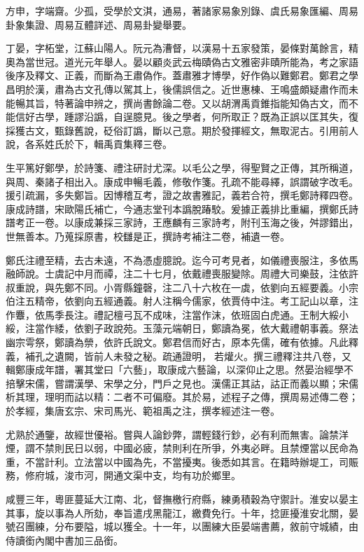 \begin{pinyinscope}
方申，字端齋。少孤，受學於文淇，通易，著諸家易象別錄、虞氏易象匯編、周易卦象集證、周易互體詳述、周易卦變舉要。

丁晏，字柘堂，江蘇山陽人。阮元為漕督，以漢易十五家發策，晏條對萬餘言，精奧為當世冠。道光元年舉人。晏以顧炎武云梅賾偽古文雅密非賾所能為，考之家語後序及釋文、正義，而斷為王肅偽作。蓋肅雅才博學，好作偽以難鄭君。鄭君之學昌明於漢，肅為古文孔傳以駕其上，後儒誤信之。近世惠棟、王鳴盛頗疑肅作而未能暢其旨，特著論申辨之，撰尚書餘論二卷。又以胡渭禹貢錐指能知偽古文，而不能信好古學，踵謬沿譌，自逞臆見。後之學者，何所取正？既為正誤以匡其失，復採獲古文，甄錄舊說，砭俗訂譌，斷以己意。期於發揮經文，無取泥古。引用前人說，各系姓氏於下，輯禹貢集釋三卷。

生平篤好鄭學，於詩箋、禮注研討尤深。以毛公之學，得聖賢之正傳，其所稱道，與周、秦諸子相出入。康成申暢毛義，修敬作箋。孔疏不能尋繹，誤謂破字改毛。援引疏漏，多失鄭旨。因博稽互考，證之故書雅記，義若合符，撰毛鄭詩釋四卷。康成詩譜，宋歐陽氏補亡，今通志堂刊本譌脫踳駮。爰據正義排比重編，撰鄭氏詩譜考正一卷。以康成兼採三家詩，王應麟有三家詩考，附刊玉海之後，舛謬錯出，世無善本。乃蒐採原書，校讎是正，撰詩考補注二卷，補遺一卷。

鄭氏注禮至精，去古未遠，不為憑虛臆說。迄今可考見者，如儀禮喪服注，多依馬融師說。士虞記中月而禫，注二十七月，依戴禮喪服變除。周禮大司樂鼓，注依許叔重說，與先鄭不同。小胥縣鐘磬，注二八十六枚在一虡，依劉向五經要義。小宗伯注五精帝，依劉向五經通義。射人注稱今儒家，依賈侍中注。考工記山以章，注作麞，依馬季長注。禮記檀弓瓦不成味，注當作沫，依班固白虎通。王制大綏小綏，注當作緌，依劉子政說苑。玉藻元端朝日，鄭讀為冕，依大戴禮朝事義。祭法幽宗雩祭，鄭讀為禜，依許氏說文。鄭君信而好古，原本先儒，確有依據。凡此釋義，補孔之遺闕，皆前人未發之秘。疏通證明，若爟火。撰三禮釋注共八卷，又輯鄭康成年譜，署其堂曰「六藝」，取康成六藝論，以深仰止之思。然晏治經學不掊擊宋儒，嘗謂漢學、宋學之分，門戶之見也。漢儒正其詁，詁正而義以顯；宋儒析其理，理明而詁以精：二者不可偏廢。其於易，述程子之傳，撰周易述傳二卷；於孝經，集唐玄宗、宋司馬光、範祖禹之注，撰孝經述注一卷。

尤熟於通鑒，故經世優裕。嘗與人論鈔弊，謂輕錢行鈔，必有利而無害。論禁洋煙，謂不禁則民日以弱，中國必疲，禁則利在所爭，外夷必畔。且禁煙當以民命為重，不當計利。立法當以中國為先，不當擾夷。後悉如其言。在籍時辦堤工，司賑務，修府城，浚市河，開通文渠中支，均有功於鄉里。

咸豐三年，粵匪蔓延大江南、北，督撫檄行府縣，練勇積穀為守禦計。淮安以晏主其事，旋以事為人所劾，奉旨遣戌黑龍江，繳費免行。十年，捻匪擾淮安北關，晏號召團練，分布要隘，城以獲全。十一年，以團練大臣晏端書薦，敘前守城績，由侍讀銜內閣中書加三品銜。


\end{pinyinscope}
